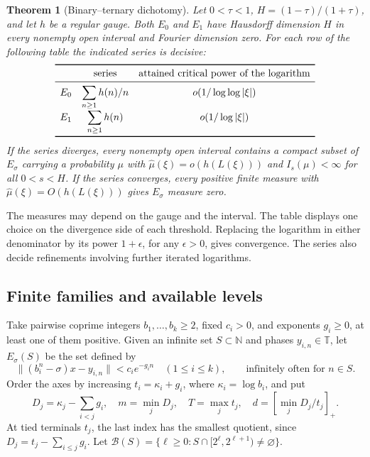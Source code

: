\documentclass[11pt,a4paper,reqno]{amsart}
\newtheorem{theorem}{Theorem}[section]
\theoremstyle{definition}
\theoremstyle{remark}
\numberwithin{equation}{section}
\begin{document}
\begin{theorem}[Binary--ternary dichotomy]\label{thm:binary}
Let \(0<\tau<1\), \(H=(1-\tau)/(1+\tau)\), and let \(h\) be a regular
gauge. Both \(E_0\) and \(E_1\) have Hausdorff dimension \(H\) in
every nonempty open interval and Fourier dimension zero. For each row
of the following table the indicated series is decisive:
\[
\begin{array}{lcc}
\toprule
 &\text{series}&\text{attained critical power of the logarithm}\\
\midrule
 E_0 & \displaystyle\sum_{n\ge1}h(n)/n & o(1/\log\log|\xi|)\\[2pt]
 E_1 & \displaystyle\sum_{n\ge1}h(n)   & o(1/\log|\xi|)\\
\bottomrule
\end{array}
\]
If the series diverges, every nonempty open interval contains a
compact subset of \(E_\sigma\) carrying a probability \(\mu\) with
\(\widehat\mu(\xi)=o(h(L(\xi)))\) and \(I_s(\mu)<\infty\) for all
\(0<s<H\). If the series converges, every positive finite measure
with \(\widehat\mu(\xi)=O(h(L(\xi)))\) gives \(E_\sigma\) measure zero.
\end{theorem}
The measures may depend on the gauge and the interval. The table
displays one choice on the divergence side of each threshold.
Replacing the logarithm in either denominator by its power
\(1+\epsilon\), for any \(\epsilon>0\), gives convergence. The series
also decide refinements involving further iterated logarithms.

\subsection{Finite families and available levels}
Take pairwise coprime integers \(b_1,\dots,b_k\ge2\), fixed
\(c_i>0\), and exponents \(g_i\ge0\), at least one of them positive.
Given an infinite set \(S\subset\mathbb N\) and phases
\(y_{i,n}\in\mathbb T\), let \(E_\sigma(S)\) be the set defined by
\begin{equation}\label{eq:levels}
 \|(b_i^n-\sigma)x-y_{i,n}\|<c_i e^{-g_i n}
 \quad (1\le i\le k),\qquad \text{infinitely often for }n\in S .
\end{equation}
Order the axes by increasing \(t_i=\kappa_i+g_i\), where
\(\kappa_i=\log b_i\), and put
\begin{equation}\label{eq:dimension}
 D_j=\kappa_j-\sum_{i<j}g_i,\quad
 m=\min_j D_j,\quad T=\max_j t_j,\quad
 d=\left[\min_j D_j/t_j\right]_+ .
\end{equation}
At tied terminals \(t_j\), the last index has the smallest quotient,
since \(D_j=t_j-\sum_{i\le j}g_i\). Let
\(\mathcal B(S)=\{\ell\ge0:S\cap[2^\ell,2^{\ell+1})\ne\varnothing\}\).
\end{document}
